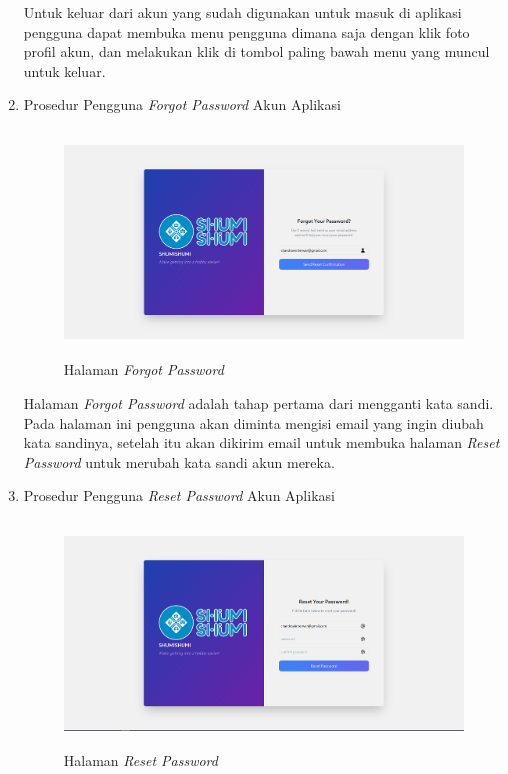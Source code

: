 \documentclass[a4paper]{article}
\begin{document}
\begin{enumerate}
Untuk keluar dari akun yang sudah digunakan untuk masuk di aplikasi pengguna dapat membuka menu pengguna dimana saja dengan klik foto profil akun, dan melakukan klik di tombol paling bawah menu yang muncul untuk keluar.

\item Prosedur Pengguna \textit{Forgot Password} Akun Aplikasi

\begin{figure}[h]
    \centering
    \includegraphics*[height=6cm]{images/prosedur pengunaan aplikasi/Forgot.png}
    \caption{Halaman \textit{Forgot Password}}
\end{figure}

Halaman \textit{Forgot Password} adalah tahap pertama dari mengganti kata sandi. Pada halaman ini pengguna akan diminta mengisi email yang ingin diubah kata sandinya, setelah itu akan dikirim email untuk membuka halaman \textit{Reset Password} untuk merubah kata sandi akun mereka.

\item Prosedur Pengguna \textit{Reset Password} Akun Aplikasi

\begin{figure}[h]
    \centering
    \includegraphics*[height=6cm]{images/prosedur pengunaan aplikasi/Reset Password.png}
    \caption{Halaman \textit{Reset Password}}
\end{figure}


\end{enumerate}
\end{document}

